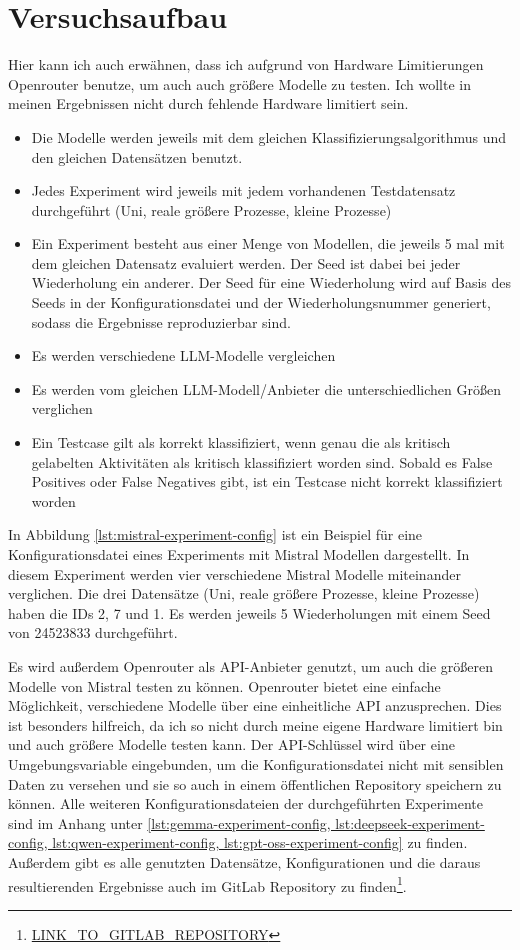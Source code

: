 \chapter{Versuchsaufbau}\label{ch:versuchsaufbau}

Hier kann ich auch erwähnen, dass ich aufgrund von Hardware Limitierungen Openrouter benutze, um auch auch größere Modelle zu testen. Ich wollte in meinen Ergebnissen nicht durch fehlende Hardware limitiert sein.

\begin{itemize}
    \item Die Modelle werden jeweils mit dem gleichen Klassifizierungsalgorithmus und den gleichen Datensätzen benutzt.
    \item Jedes Experiment wird jeweils mit jedem vorhandenen Testdatensatz durchgeführt (Uni, reale größere Prozesse, kleine Prozesse)
    \item Ein Experiment besteht aus einer Menge von Modellen, die jeweils 5 mal mit dem gleichen Datensatz evaluiert werden. Der Seed ist dabei bei jeder Wiederholung ein anderer. Der Seed für eine Wiederholung wird auf Basis des Seeds in der Konfigurationsdatei und der Wiederholungsnummer generiert, sodass die Ergebnisse reproduzierbar sind.
    \item Es werden verschiedene LLM-Modelle vergleichen
    \item Es werden vom gleichen LLM-Modell/Anbieter die unterschiedlichen Größen verglichen
    \item Ein Testcase gilt als korrekt klassifiziert, wenn genau die als kritisch gelabelten Aktivitäten als kritisch klassifiziert worden sind. Sobald es False Positives oder False Negatives gibt, ist ein Testcase nicht korrekt klassifiziert worden
\end{itemize}

In Abbildung \ref{lst:mistral-experiment-config} ist ein Beispiel für eine Konfigurationsdatei eines Experiments mit Mistral Modellen dargestellt. In diesem Experiment werden vier verschiedene Mistral Modelle miteinander verglichen. Die drei Datensätze (Uni, reale größere Prozesse, kleine Prozesse) haben die IDs 2, 7 und 1. Es werden jeweils 5 Wiederholungen mit einem Seed von 24523833 durchgeführt.

Es wird außerdem Openrouter als API-Anbieter genutzt, um auch die größeren Modelle von Mistral testen zu können. Openrouter bietet eine einfache Möglichkeit, verschiedene Modelle über eine einheitliche API anzusprechen. Dies ist besonders hilfreich, da ich so nicht durch meine eigene Hardware limitiert bin und auch größere Modelle testen kann. Der API-Schlüssel wird über eine Umgebungsvariable eingebunden, um die Konfigurationsdatei nicht mit sensiblen Daten zu versehen und sie so auch in einem öffentlichen Repository speichern zu können. Alle weiteren Konfigurationsdateien der durchgeführten Experimente sind im Anhang unter \ref{lst:gemma-experiment-config, lst:deepseek-experiment-config, lst:qwen-experiment-config, lst:gpt-oss-experiment-config} zu finden. Außerdem gibt es alle genutzten Datensätze, Konfigurationen und die daraus resultierenden Ergebnisse auch im GitLab Repository zu finden\footnote{\url{LINK_TO_GITLAB_REPOSITORY}}.

